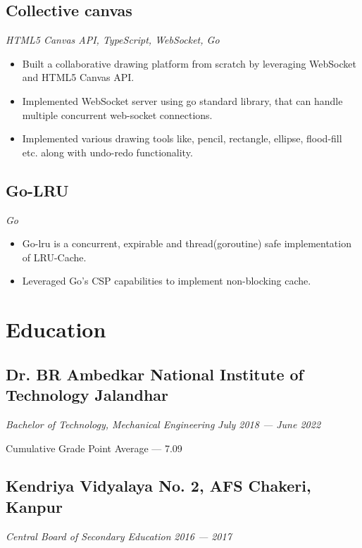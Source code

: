 \documentclass[a4paper]{article}
\begin{document}
\subsection{Collective canvas}
\textit{HTML5 Canvas API, TypeScript, WebSocket, Go}
\hfill
\href{https://collective-canvas.netlify.app/}{ \faLink}
\textbar
\href{https://github.com/jatinkumar-me/collective-canvas.git}{ \faCode}
\href{https://github.com/jatinkumar-me/cc-server}{ \faCode}
\begin{itemize}
    \item Built a collaborative drawing platform from scratch by leveraging WebSocket and HTML5 Canvas API. 
    \item Implemented WebSocket server using go standard library, that can handle multiple concurrent web-socket connections.
    \item Implemented various drawing tools like, pencil, rectangle, ellipse, flood-fill etc. along with undo-redo functionality.
\end{itemize}

\subsection{Go-LRU}
\textit{Go}
\hfill
\href{https://type-learn.netlify.app/}{ \faLink }
\textbar
\href{https://github.com/jatinkumar-me/type-learn}{ \faCode}
\begin{itemize}
	\item Go-lru is a concurrent, expirable and thread(goroutine) safe implementation of LRU-Cache.
	\item Leveraged Go's CSP capabilities to implement non-blocking cache.
\end{itemize}

\section{Education}
\subsection{Dr. BR Ambedkar National Institute of Technology Jalandhar}
\textit{Bachelor of Technology, Mechanical Engineering}
\hfill
\textit{July 2018 --- June 2022}

Cumulative Grade Point Average --- 7.09

\subsection{Kendriya Vidyalaya No. 2, AFS Chakeri, Kanpur}
\textit{Central Board of Secondary Education}
\hfill
\textit{2016 --- 2017}
\end{document}
